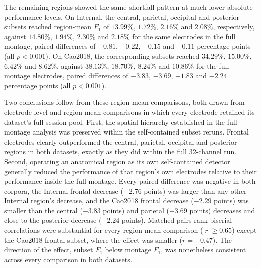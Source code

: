 The remaining regions showed the same shortfall pattern at much lower absolute performance levels. On Internal, the central, parietal, occipital and posterior subsets reached region-mean $F_1$ of $13.99\%$, $1.72\%$, $2.16\%$ and $2.08\%$, respectively, against $14.80\%$, $1.94\%$, $2.30\%$ and $2.18\%$ for the same electrodes in the full montage, paired differences of $-0.81$, $-0.22$, $-0.15$ and $-0.11$ percentage points (all $p<0.001$). On Cao2018, the corresponding subsets reached $34.29\%$, $15.00\%$, $6.42\%$ and $8.62\%$, against $38.13\%$, $18.70\%$, $8.24\%$ and $10.86\%$ for the full-montage electrodes, paired differences of $-3.83$, $-3.69$, $-1.83$ and $-2.24$ percentage points (all $p<0.001$).

Two conclusions follow from these region-mean comparisons, both drawn from electrode-level and region-mean comparisons in which every electrode retained its dataset's full session pool. First, the spatial hierarchy established in the full-montage analysis was preserved within the self-contained subset reruns. Frontal electrodes clearly outperformed the central, parietal, occipital and posterior regions in both datasets, exactly as they did within the full 32-channel run. Second, operating an anatomical region as its own self-contained detector generally reduced the performance of that region's own electrodes relative to their performance inside the full montage. Every paired difference was negative in both corpora, the Internal frontal decrease ($-2.76$ points) was larger than any other Internal region's decrease, and the Cao2018 frontal decrease ($-2.29$ points) was smaller than the central ($-3.83$ points) and parietal ($-3.69$ points) decreases and close to the posterior decrease ($-2.24$ points). Matched-pairs rank-biserial correlations were substantial for every region-mean comparison ($|r|\geq0.65$) except the Cao2018 frontal subset, where the effect was smaller ($r=-0.47$). The direction of the effect, subset $F_1$ below montage $F_1$, was nonetheless consistent across every comparison in both datasets.

